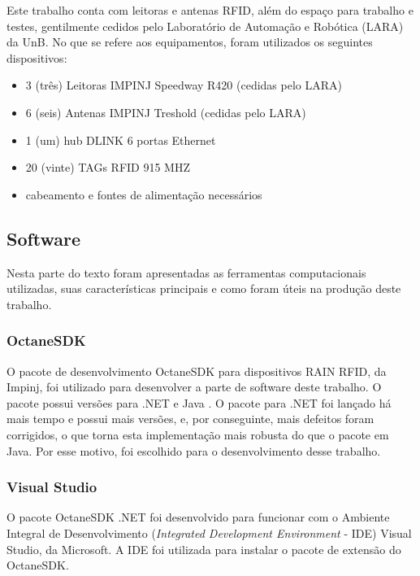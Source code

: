  Este trabalho conta com leitoras e antenas RFID, além do espaço para trabalho e testes, gentilmente cedidos pelo Laboratório de Automação e Robótica (LARA) da UnB. No que se refere aos equipamentos, foram utilizados os seguintes dispositivos:
 
 \begin{itemize}
     \item 3 (três) Leitoras IMPINJ Speedway R420 (cedidas pelo LARA)
     \item 6 (seis) Antenas IMPINJ Treshold (cedidas pelo LARA)
     \item 1 (um) hub DLINK 6 portas Ethernet
     \item 20 (vinte) TAGs RFID 915 MHZ
     \item cabeamento e fontes de alimentação necessários
 \end{itemize}
 
 \subsection{Software} \label{section:met-software}
 
 Nesta parte do texto foram apresentadas as ferramentas computacionais utilizadas, suas características principais e como foram úteis na produção deste trabalho.
 
 \subsubsection{OctaneSDK}
 
 O pacote de desenvolvimento OctaneSDK para dispositivos RAIN RFID, da Impinj, foi utilizado para desenvolver a parte de software deste trabalho. O pacote possui versões para .NET e Java \cite{OctaneSDK}. O pacote para .NET foi lançado há mais tempo e possui mais versões, e, por conseguinte, mais defeitos foram corrigidos, o que torna esta implementação mais robusta do que o pacote em Java. Por esse motivo, foi escolhido para o desenvolvimento desse trabalho.
 
 \subsubsection{Visual Studio}
 
 O pacote OctaneSDK .NET foi desenvolvido para funcionar com o Ambiente Integral de Desenvolvimento (\textit{Integrated Development Environment} - IDE) Visual Studio, da Microsoft. A IDE foi utilizada para instalar o pacote de extensão do OctaneSDK. \cite{OctaneSDK}
 
